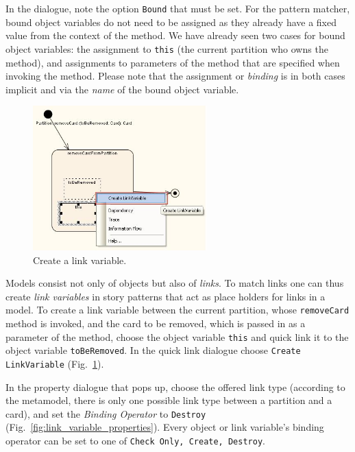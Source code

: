 In the dialogue, note the option \texttt{Bound} that must be set.
For the pattern matcher, bound object variables do not need to be assigned as
they already have a fixed value from the context of the method.  We have already
seen two cases  for bound object variables: the assignment to \texttt{this} (the
current  partition who owns the method), and assignments to parameters of the
method that  are specified when invoking the method.  Please note that the
assignment or \emph{binding} is in both cases implicit and via the \emph{name}
of the bound object variable. 

\begin{figure}[htp]
\begin{center}
  \includegraphics[width=0.6\textwidth]{pics/sdmBilder/removeCard/sdm11RAW}
  \caption{Create a link variable.}   
  \label{fig:link_variable}
\end{center}
\end{figure}

Models consist not only of objects but also of \emph{links}.  To match links one
can thus create \emph{link variables} in story patterns that act as place
holders for links in a model.  To create a link variable between the current
partition, whose \texttt{removeCard} method is invoked, and the card
to be removed, which is passed in as a parameter of the method, choose
the object variable \texttt{this} and quick link it to the object variable
\texttt{toBeRemoved}.  In the quick link dialogue choose \texttt{Create
LinkVariable} (Fig.~\ref{fig:link_variable}).

In the property dialogue that pops up, choose the offered link type (according
to the metamodel, there is only one possible link type between a partition and a
card), and set the \emph{Binding Operator} to \texttt{Destroy}
(Fig.~\ref{fig:link_variable_properties}). Every object or link variable's
binding operator can be set to one of \texttt{Check Only, Create,
Destroy}.\clearpage

